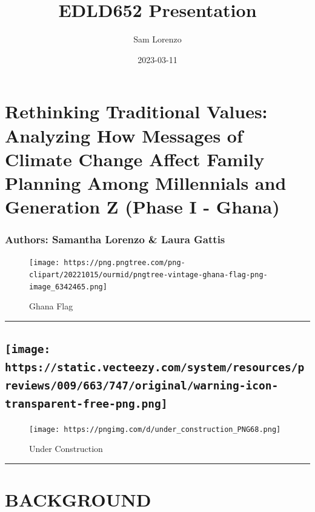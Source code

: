 \documentclass[
]{article}
\title{EDLD652 Presentation}
\author{Sam Lorenzo}
\date{2023-03-11}
\begin{document}
\maketitle

\hypertarget{rethinking-traditional-values-analyzing-how-messages-of-climate-change-affect-family-planning-among-millennials-and-generation-z-phase-i---ghana}{%
\section{Rethinking Traditional Values: Analyzing How Messages of
Climate Change Affect Family Planning Among Millennials and Generation Z
(Phase I -
Ghana)}\label{rethinking-traditional-values-analyzing-how-messages-of-climate-change-affect-family-planning-among-millennials-and-generation-z-phase-i---ghana}}

\hypertarget{authors-samantha-lorenzo-laura-gattis}{%
\subsubsection{Authors: Samantha Lorenzo \& Laura
Gattis}\label{authors-samantha-lorenzo-laura-gattis}}

\begin{figure}
\centering
\texttt{[image: https://png.pngtree.com/png-clipart/20221015/ourmid/pngtree-vintage-ghana-flag-png-image\_6342465.png]}
\caption{Ghana Flag}
\end{figure}

\begin{center}\rule{0.5\linewidth}{0.5pt}\end{center}

\hypertarget{warning}{%
\subsection{\texorpdfstring{\protect\texttt{[image: https://static.vecteezy.com/system/resources/previews/009/663/747/original/warning-icon-transparent-free-png.png]}}{Warning}}\label{warning}}

\begin{figure}
\centering
\texttt{[image: https://pngimg.com/d/under\_construction\_PNG68.png]}
\caption{Under Construction}
\end{figure}

\begin{center}\rule{0.5\linewidth}{0.5pt}\end{center}

\hypertarget{background}{%
\section{BACKGROUND}\label{background}}
\end{document}

